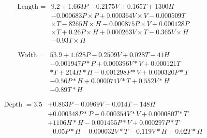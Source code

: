 \documentclass[10pt]{article}
\begin{document}
\begin{align*}
\text { Length }= & 9.2+1.663 P-0.2175 V+0.165 T+1300 H \\
& -0.000683 P \times P+0.000364 V \times V-0.000509 T \\
& \times T-8265 H \times H-0.000875 P \times V+0.000128 P \\
& \times T+0.26 P \times H+0.000263 V \times T-0.365 V \times H \\
& -0.93 T \times H \tag{17}
\end{align*}



\begin{align*}
\text { Width }= & 53.9+1.628 P-0.2509 V+0.028 T-41 H \\
& -0.001947 P * P+0.000396 V * V+0.000121 T \\
& * T+214 H * H-0.001298 P * V+0.000320 P * T \\
& -0.56 P * H+0.000071 V * T+0.552 V * H \\
& -0.89 T * H \tag{18}
\end{align*}



\begin{align*}
\text { Depth }=3.5 & +0.863 P-0.0969 V-0.014 T-148 H \\
& +0.000348 P * P+0.000354 V * V+0.000080 T * T \\
& +1106 H * H-0.001455 P * V+0.000297 P * T \\
& -0.05 P * H-0.000032 V * T-0.119 V * H+0.02 T * H \tag{19}
\end{align*}
\end{document}
